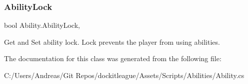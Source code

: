 \subsubsection{\texorpdfstring{Ability\+Lock}{AbilityLock}}
{\footnotesize\ttfamily bool Ability.\+Ability\+Lock\hspace{0.3cm}{\ttfamily [get]}, {\ttfamily [set]}}



Get and Set ability lock. Lock prevents the player from using abilities. 



The documentation for this class was generated from the following file\+:\begin{DoxyCompactItemize}
\item 
C\+:/\+Users/\+Andreas/\+Git Repos/dockitleague/\+Assets/\+Scripts/\+Abilities/Ability.\+cs\end{DoxyCompactItemize}
